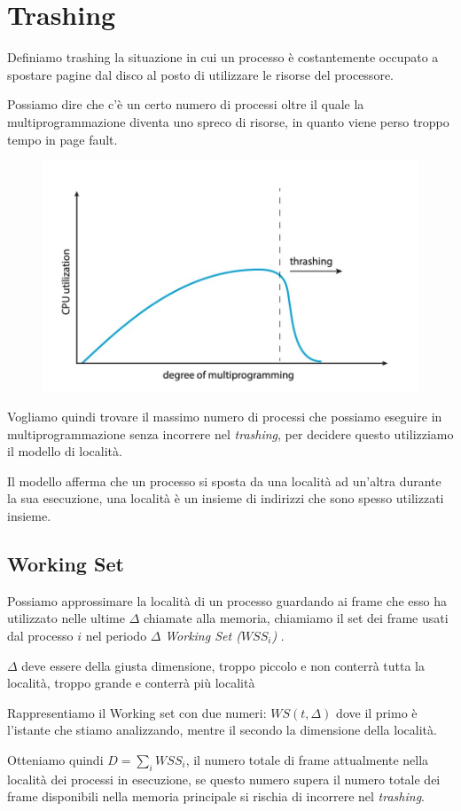 \section{Trashing}
Definiamo trashing la situazione in cui un processo è costantemente occupato a spostare pagine dal disco al posto di utilizzare le risorse del processore.

\spacer
Possiamo dire che c'è un certo numero di processi oltre il quale la multiprogrammazione diventa uno spreco di risorse, in quanto viene perso troppo tempo in page fault.
\begin{figure}[H]
    \centering
    \includegraphics[width=0.4\linewidth]{assets/trashing.jpg}
\end{figure}

Vogliamo quindi trovare il massimo numero di processi che possiamo eseguire in multiprogrammazione senza incorrere nel \textit{trashing}, per decidere questo utilizziamo il modello di località.

Il modello afferma che un processo si sposta da una località ad un'altra durante la sua esecuzione, una località è un insieme di indirizzi che sono spesso utilizzati insieme.

\subsection{Working Set}
Possiamo approssimare la località di un processo guardando ai frame che esso ha utilizzato nelle ultime $\Delta$ chiamate alla memoria, chiamiamo il set dei frame usati dal processo $i$ nel periodo $\Delta$ \textit{Working Set ($WSS_i$)} .

\begin{note}
    $\Delta$ deve essere della giusta dimensione, troppo piccolo e non conterrà tutta la località, troppo grande e conterrà più località
\end{note}

Rappresentiamo il Working set con due numeri: $WS(t, \Delta)$ dove il primo è l'istante che stiamo analizzando, mentre il secondo la dimensione della località.

Otteniamo quindi $D = \sum_i WSS_i$, il numero totale di frame attualmente nella località dei processi in esecuzione, se questo numero supera il numero totale dei frame disponibili nella memoria principale si rischia di incorrere nel \textit{trashing}.

